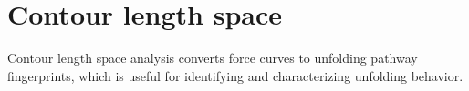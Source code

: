 \chapter{Contour length space}
\label{sec:contour-space}

Contour length space analysis converts force curves to unfolding
pathway fingerprints\citet{puchner08}, which is useful for
identifying and characterizing unfolding behavior.
